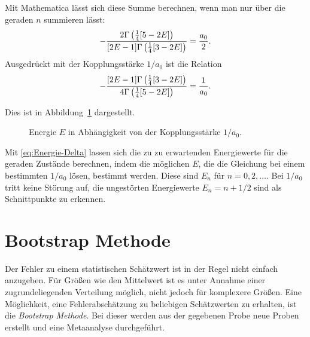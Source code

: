 Mit Mathematica lässt sich diese Summe berechnen, wenn man nur über die geraden
$n$ summieren lässt:
\[
    - \frac{2 \Gamma\del{\frac 14[5-2E]}}{[2E-1]\Gamma\del{\frac 14[3-2E]}}
    = \frac{a_0}2.
\]
Ausgedrückt mit der Kopplungsstärke $1/a_0$ ist die Relation
\begin{equation}
    \label{eq:Energie-Delta}
    - \frac{[2E-1]\Gamma\del{\frac 14[3-2E]}}{4 \Gamma\del{\frac 14[5-2E]}}
    = \frac1{a_0}.
\end{equation}

Dies ist in Abbildung~\ref{fig:E_a0} dargestellt.

\begin{figure}[htbp]
    \centering
    \caption{%
        Energie $E$ in Abhängigkeit von der Kopplungsstärke $1/a_0$.
    }
    \label{fig:E_a0}
\end{figure}

Mit \eqref{eq:Energie-Delta} lassen sich die zu zu erwartenden Energiewerte für
die geraden Zustände berechnen, indem die möglichen $E$, die die Gleichung bei
einem bestimmten $1/a_0$ lösen, bestimmt werden. Diese sind $E_n$ für $n = 0,
2, \ldots$. Bei $1/a_0$ tritt keine Störung auf, die ungestörten
Energiewerte $E_n = n + 1/2$ sind als Schnittpunkte zu erkennen.



\chapter{Bootstrap Methode}


Der Fehler zu einem statistischen Schätzwert ist in der Regel nicht einfach
anzugeben. Für Größen wie den Mittelwert ist es unter Annahme einer
zugrundeliegenden Verteilung möglich, nicht jedoch für komplexere Größen. Eine
Möglichkeit, eine Fehlerabschätzung zu beliebigen Schätzwerten zu erhalten, ist
die \emph{Bootstrap Methode}. Bei dieser werden aus der gegebenen Probe neue
Proben erstellt und eine Metaanalyse durchgeführt.

